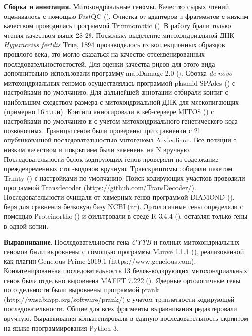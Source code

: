 \textbf{Сборка и аннотация.} \underline{Митохондриальные геномы.} Качество сырых чтений оценивалось с помощью FastQC (\cite{Andrews2010}). Очистка от адаптеров и фрагментов с низким качеством проводилась программой Trimmomatic (\cite{Bolger2014}). В работу брали только чтения качеством выше 28-29. Поскольку выделение митохондриальной ДНК \textit{Hyperacrius fertilis} True, 1894 производилось из коллекционных образцов прошлого века, это могло сказаться на качестве отсеквенированных последовательностостостей. Для оценки качества ридов для этого вида дополнительно использовали программу mapDamage 2.0 (\cite{Jonsson2013}). Сборка \textit{de novo} митохондриальных геномов осуществлялась программой plasmid SPAdes (\cite{Bankevich2012}) с настройками по умолчанию. Для дальнейшей аннотации отбирали контиг с наибольшим сходством размера с митохондриальной ДНК для млекопитающих (примерно 16 т.п.н). Контиги аннотировали в веб-сервере MITOS (\cite{Bernt2013}) с настройками по умолчанию и с учетом митохондриального генетического кода позвоночных. Границы генов были проверены при сравнении с 21 опубликованной последовательностью митогенома Arvicolinae. Все позиции с низким качеством и покрытием были заменены на N вручную. Последовательности белок-кодирующих генов проверяли на содержание преждевременных стоп-кодонов вручную. \underline{Tранскриптомы} собирали пакетом Trinity (\cite{Grabherr2011}) с настройками по умолчанию. Поиск кодирующих участков проводили программой Transdecoder (https://github.com/TransDecoder/). Последовательности очищали от химерных генов программой DIAMOND (\cite{Buchfink2015}), беря для сравнения белковую базу NCBI (nr). Ортологичные гены определяли с помощью Proteinortho (\cite{Lechner2011}) и фильтровали в среде R 3.4.4 (\cite{RCoreTeam2017}), оставляя только гены в одной копии. 

\textbf{Выравнивание}. Последовательности гена \textit{CYTB} и полных митохондриальных геномов были выровнены с помощью программы Mauve 1.1.1 (\cite{Darling2004}), реализованной как плагин Geneious Prime 2019.1 (https://www.geneious.com). Конкатенированная последовательность 13 белок-кодирующих митохондриальных генов была отдельно выровнена MAFFT 7.222 (\cite{Katoh2014}). Ядерные ортологичные гены по отдельности были выровнены программой prank (http://wasabiapp.org/software/prank/) с учетом триплетности кодирующей последовательности. Общие для всех фрагменты выравнивания редактировали вручную. Выравнивания конкатенировали в единую последовательность скриптом на языке программирования Python 3.

